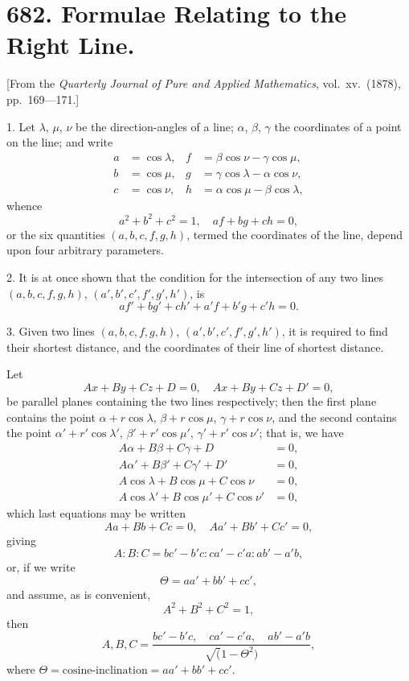 \documentclass[12pt,a4paper]{article}
\theoremstyle{cayley}
\theoremstyle{definition}
\numberwithin{equation}{section}
\begin{document}
\newpage

\section*{682. Formulae Relating to the Right Line.}

[From the \textit{Quarterly Journal of Pure and Applied Mathematics}, vol.\ xv.\ (1878), pp.\ 169---171.]

1. Let $\lambda$, $\mu$, $\nu$ be the direction-angles of a line; $\alpha$, $\beta$, $\gamma$ the coordinates of a point on the line; and write
\begin{align*}
a &= \cos \lambda, & f &= \beta \cos \nu - \gamma \cos \mu, \\
b &= \cos \mu, & g &= \gamma \cos \lambda - \alpha \cos \nu, \\
c &= \cos \nu, & h &= \alpha \cos \mu - \beta \cos \lambda,
\end{align*}
whence
\[
a^2 + b^2 + c^2 = 1, \quad af + bg + ch = 0,
\]
or the six quantities $(a, b, c, f, g, h)$, termed the coordinates of the line, depend upon four arbitrary parameters.

2. It is at once shown that the condition for the intersection of any two lines $(a, b, c, f, g, h)$, $(a', b', c', f', g', h')$, is
\[
af' + bg' + ch' + a'f + b'g + c'h = 0.
\]

3. Given two lines $(a, b, c, f, g, h)$, $(a', b', c', f', g', h')$, it is required to find their shortest distance, and the coordinates of their line of shortest distance.

Let
\[
Ax + By + Cz + D = 0, \quad Ax + By + Cz + D' = 0,
\]
be parallel planes containing the two lines respectively; then the first plane contains the point $\alpha + r\cos\lambda$, $\beta + r\cos\mu$, $\gamma + r\cos\nu$, and the second contains the point $\alpha' + r'\cos\lambda'$, $\beta' + r'\cos\mu'$, $\gamma' + r'\cos\nu'$; that is, we have
\begin{align*}
A\alpha + B\beta + C\gamma + D &= 0, \\
A\alpha' + B\beta' + C\gamma' + D' &= 0, \\
A\cos\lambda + B\cos\mu + C\cos\nu &= 0, \\
A\cos\lambda' + B\cos\mu' + C\cos\nu' &= 0,
\end{align*}
which last equations may be written
\[
Aa + Bb + Cc = 0, \quad Aa' + Bb' + Cc' = 0,
\]
giving
\[
A : B : C = bc' - b'c : ca' - c'a : ab' - a'b,
\]
or, if we write
\[
\Theta = aa' + bb' + cc',
\]
and assume, as is convenient,
\[
A^2 + B^2 + C^2 = 1,
\]
then
\[
A, B, C = \frac{bc' - b'c, \quad ca' - c'a, \quad ab' - a'b}{\surd(1 - \Theta^2)},
\]
where $\Theta = \text{cosine-inclination} = aa' + bb' + cc'$.
\end{document}

